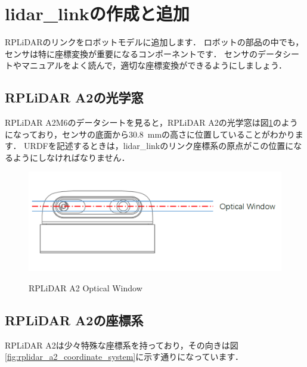 \documentclass[{../../master}]{subfiles}
\begin{document}
\section{\textsf{lidar\_link}の作成と追加}

RPLiDARのリンクをロボットモデルに追加します．
ロボットの部品の中でも，センサは特に座標変換が重要になるコンポーネントです．
センサのデータシートやマニュアルをよく読んで，適切な座標変換ができるようにしましょう．

\subsection{RPLiDAR A2の光学窓}

RPLiDAR A2M6のデータシートを見ると，RPLiDAR A2の光学窓は図\ref{fig:rplidar_a2_optical_window}のようになっており，センサの底面から\SI{30.8}{mm}の高さに位置していることがわかります．
URDFを記述するときは，\textsf{lidar\_link}のリンク座標系の原点がこの位置になるようにしなければなりません．

\begin{figure}[ht]
  \centering
  \includegraphics[width=100truemm]{images/rplidar_a2_optical_window.png}
  \label{fig:rplidar_a2_optical_window}
  \caption{RPLiDAR A2 Optical Window}
\end{figure}

\subsection{RPLiDAR A2の座標系}

RPLiDAR A2は少々特殊な座標系を持っており，その向きは図\ref{fig:rplidar_a2_coordinate_system}に示す通りになっています．
\end{document}
